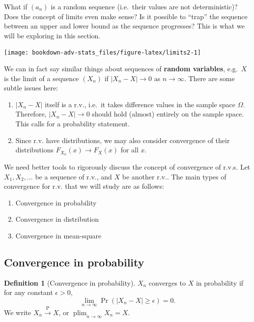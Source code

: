 \documentclass[
]{book}
\providecommand{\tightlist}{%
  \setlength{\itemsep}{0pt}\setlength{\parskip}{0pt}}
\DeclareMathOperator*{\plim}{plim}
\theoremstyle{definition}
\newtheorem{definition}{Definition}[chapter]
\theoremstyle{definition}
\theoremstyle{definition}
\theoremstyle{definition}
\theoremstyle{remark}
\begin{document}
What if \((a_n)\) is a random sequence (i.e.~their values are not deterministic)?
Does the concept of limits even make sense?
Is it possible to ``trap'' the sequence between an upper and lower bound as the sequence progresses?
This is what we will be exploring in this section.

\begin{center}\texttt{[image: bookdown-adv-stats\_files/figure-latex/limits2-1]} \end{center}

We can in fact say similar things about sequences of \textbf{random variables}, e.g.~\(X\) is the limit of a sequence
\((X_n)\) if \(|X_n - X|\to 0\) as \(n\to\infty\).
There are some subtle issues here:

\begin{enumerate}
\def\labelenumi{\arabic{enumi}.}
\item
  \(|X_n-X|\) itself is a r.v., i.e.~it takes difference values in the
  sample space \(\Omega\). Therefore, \(|X_n - X|\to 0\) should hold
  (almost) entirely on the sample space. This calls for a probability
  statement.
\item
  Since r.v. have distributions, we may also consider convergence of
  their distributions \(F_{X_n}(x)\to F_X(x)\) for all \(x\).
\end{enumerate}

We need better tools to rigorously discuss the concept of convergence of r.v.s.
Let \(X_1,X_2,\dots\) be a sequence of r.v., and \(X\)
be another r.v.. The main types of convergence for r.v. that we will study are as follows:

\begin{enumerate}
\def\labelenumi{\arabic{enumi}.}
\tightlist
\item
  Convergence in probability
\item
  Convergence in distribution
\item
  Convergence in mean-square
\end{enumerate}

\hypertarget{convergence-in-probability}{%
\subsection{Convergence in probability}\label{convergence-in-probability}}

\begin{definition}[Convergence in probability]
\(X_n\) converges to \(X\) in probability if for any constant \(\epsilon>0\),
\[\lim_{n\to\infty} \Pr(|X_n-X|\geq\epsilon) = 0.\]
We write
\(X_n\xrightarrow{\text{P}}X\), or \(\plim_{n\to\infty}X_n = X\).
\end{definition}
\end{document}
